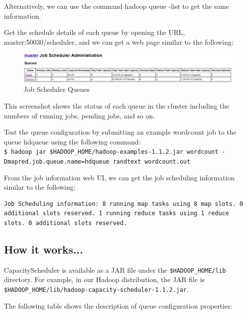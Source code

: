 
Alternatively, we can use the command hadoop queue -list to get the same information. 

Get the schedule details of each queue by opening the URL, master:50030/scheduler, and we can get a web page similar to the following: 
\begin{figure}[h]
  \centering
  \includegraphics[width=\textwidth]{figs/5163OS_04_18.png}
  \caption{Job Scheduler Queues}\label{fig:job.queues}
\end{figure} 


This screenshot shows the status of each queue in the cluster including the numbers of running jobs, pending jobs, and so on. 

Test the queue configuration by submitting an example wordcount job to the queue hdqueue using the following command: \\ 
\verb|$ hadoop jar $HADOOP_HOME/hadoop-examples-1.1.2.jar wordcount -Dmapred.job.queue.name=hdqueue randtext wordcount.out | 

From the job information web UI, we can get the job scheduling information similar to the following: 
\begin{verbatim}
Job Scheduling information: 8 running map tasks using 8 map slots. 0 additional slots reserved. 1 running reduce tasks using 1 reduce slots. 0 additional slots reserved.
\end{verbatim}

\subsection*{How it works...}
CapacityScheduler is available as a JAR file under the \verb|$HADOOP_HOME/lib| directory. For example, in our Hadoop distribution, the JAR file is \verb|$HADOOP_HOME/lib/hadoop-capacity-scheduler-1.1.2.jar|.

The following table shows the description of queue configuration properties: 

